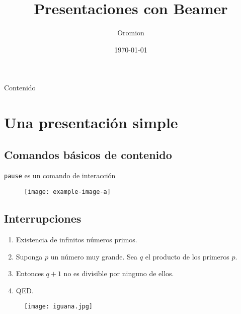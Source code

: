 \documentclass[screen]{beamer} %
\title[Beamer]{Presentaciones con Beamer}
\author[Oromion]{Oromion}
\institute{Ubuntu Colombia}
\date{\today}
\begin{document}
\begin{frame}
\maketitle
\end{frame}

\begin{frame}{Contenido}
\tableofcontents %
\end{frame}

\section{Una presentación simple}

\subsection{Comandos básicos de contenido}

\begin{frame}{\insertsubsection}{\insertsection}
\texttt{pause} es un comando de interacción
\pause
\begin{figure}[H]
\centering
\texttt{[image: example-image-a]}
\end{figure}
\end{frame}

\subsection{Interrupciones}
\begin{frame}{\insertsubsection}{\insertsection}
\begin{enumerate}
\item<2-> Existencia de infinitos números primos.
\item<1-> Suponga $p$ un número muy grande.
Sea $q$ el producto de los primeros $p$.
\item<3-> Entonces $q+1$ no es divisible por ninguno de ellos.
\item<1-4> QED. %
\end{enumerate}
\end{frame}

\begin{frame}
\begin{figure}[H]
\centering
{}
\texttt{[image: iguana.jpg]}
\end{figure}
\end{frame}
\end{document}
